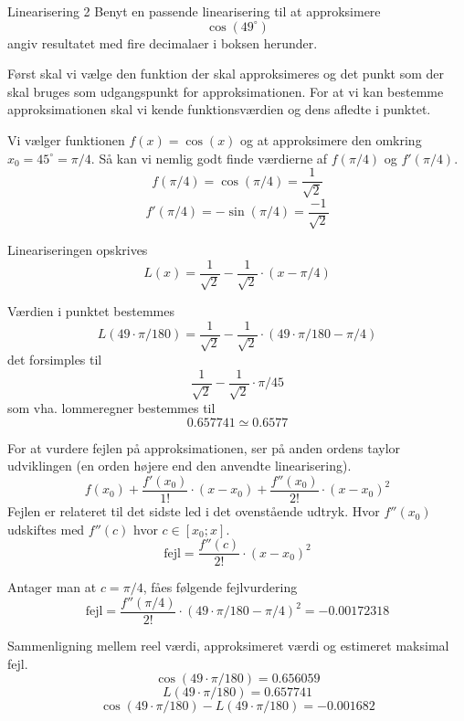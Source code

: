 \documentclass{article}
\begin{document}
\begin{exercise}{Linearisering 2}
Benyt en passende linearisering til at approksimere
\[
\cos(49^\circ)
\]
angiv resultatet med fire decimalaer i boksen herunder.

\hint
Først skal vi vælge den funktion der skal approksimeres
og det punkt som der skal bruges som udgangspunkt for
approksimationen.
For at vi kan bestemme approksimationen skal vi
kende funktionsværdien og dens afledte i punktet.

\hint
Vi vælger funktionen $f(x) = \cos(x)$ og at approksimere den
omkring $x_0 = 45^\circ = \pi / 4$.
Så kan vi nemlig godt finde værdierne af $f(\pi / 4)$ og $f'(\pi / 4)$.
\[
f(\pi / 4) = \cos(\pi / 4) = \frac{1}{\sqrt{2}}
\]
\[
f'(\pi / 4) = - \sin(\pi / 4) = \frac{-1}{\sqrt{2}}
\]

\hint
Lineariseringen opskrives
\[
L(x) = \frac{1}{\sqrt{2}} - \frac{1}{\sqrt{2}} \cdot (x - \pi / 4)
\]

\hint
Værdien i punktet bestemmes
\[
L(49 \cdot \pi / 180) = \frac{1}{\sqrt{2}} - \frac{1}{\sqrt{2}} \cdot (49 \cdot \pi / 180 - \pi / 4)
\]
det forsimples til
\[
\frac{1}{\sqrt{2}} - \frac{1}{\sqrt{2}} \cdot \pi / 45
\]
som vha. lommeregner bestemmes til
\[
0.657741 \simeq 0.6577
\]

\hint
For at vurdere fejlen på approksimationen, ser på anden
ordens taylor udviklingen (en orden højere end den
anvendte linearisering).
\[
f(x_0)
+ \frac{f'(x_0)}{1!} \cdot (x - x_0)
+ \frac{f''(x_0)}{2!} \cdot (x - x_0)^2
\]
Fejlen er relateret til det sidste led i det ovenstående udtryk.
Hvor $f''(x_0)$ udskiftes med $f''(c)$ hvor $c \in [x_0; x]$.
\[
\textrm{fejl} = \frac{f''(c)}{2!} \cdot (x - x_0)^2
\]

\hint
Antager man at $c = \pi/4$, fåes følgende fejlvurdering
\[
\textrm{fejl} = \frac{f''(\pi/4)}{2!} \cdot (49 \cdot \pi / 180 - \pi / 4)^2 =
-0.00172318\]

\hint
Sammenligning mellem reel værdi, approksimeret værdi og estimeret maksimal fejl.
\[
\cos(49 \cdot \pi/180) = 0.656059
\]
\[
L(49 \cdot \pi/180) = 0.657741
\]
\[
\cos(49 \cdot \pi/180) - L(49 \cdot \pi/180) = -0.001682
\]

\end{exercise}
\end{document}
